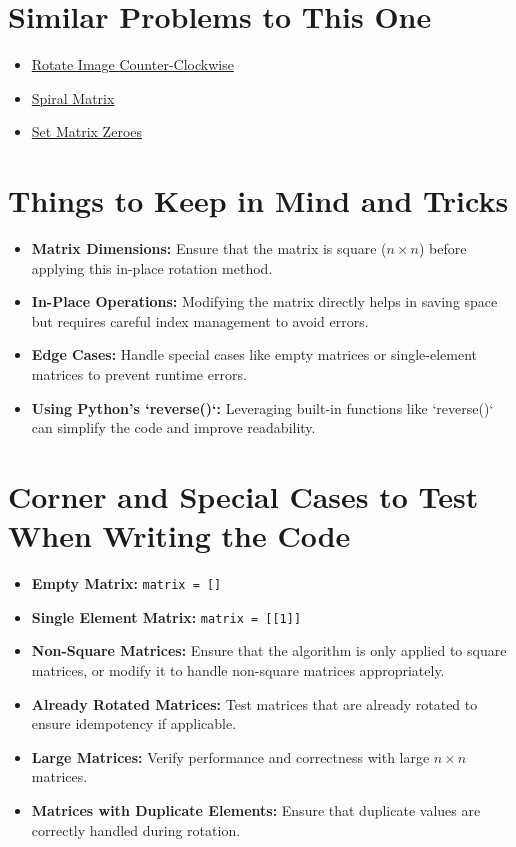 \section*{Similar Problems to This One}
\begin{itemize}
    \item \hyperref[problem:rotate_image_counter_clockwise]{Rotate Image Counter-Clockwise}
    \item \hyperref[problem:spiral_matrix]{Spiral Matrix}
    \item \hyperref[problem:set_matrix_zeroes]{Set Matrix Zeroes}
\end{itemize}

\section*{Things to Keep in Mind and Tricks}
\begin{itemize}
    \item \textbf{Matrix Dimensions:} Ensure that the matrix is square (\( n \times n \)) before applying this in-place rotation method.
    \item \textbf{In-Place Operations:} Modifying the matrix directly helps in saving space but requires careful index management to avoid errors.
    \item \textbf{Edge Cases:} Handle special cases like empty matrices or single-element matrices to prevent runtime errors.
    \item \textbf{Using Python's `reverse()`:} Leveraging built-in functions like `reverse()` can simplify the code and improve readability.
\end{itemize}

\section*{Corner and Special Cases to Test When Writing the Code}
\begin{itemize}
    \item \textbf{Empty Matrix:} \texttt{matrix = []}
    \item \textbf{Single Element Matrix:} \texttt{matrix = [[1]]}
    \item \textbf{Non-Square Matrices:} Ensure that the algorithm is only applied to square matrices, or modify it to handle non-square matrices appropriately.
    \item \textbf{Already Rotated Matrices:} Test matrices that are already rotated to ensure idempotency if applicable.
    \item \textbf{Large Matrices:} Verify performance and correctness with large \( n \times n \) matrices.
    \item \textbf{Matrices with Duplicate Elements:} Ensure that duplicate values are correctly handled during rotation.
\end{itemize}

\printindex